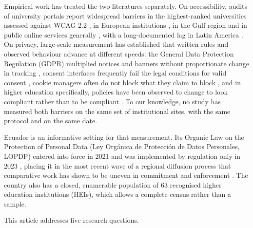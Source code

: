 \documentclass[pdflatex,sn-basic,Numbered,iicol]{sn-jnl}
\theoremstyle{thmstyleone}
\theoremstyle{thmstyletwo}
\theoremstyle{thmstylethree}
\begin{document}
Empirical work has treated the two literatures separately. On accessibility, audits of university portals report widespread barriers in the highest-ranked universities assessed against WCAG 2.2 \citep{krittika2025accessibility}, in European institutions \citep{krejtz2025higher}, in the Gulf region \citep{fakrudeen2025evaluation} and in public online services generally \citep{aljedaani2025egovernment,iniesto2025service}, with a long-documented lag in Latin America \citep{campoverdemolina2023accessibility,acostavargas2020dataset}. On privacy, large-scale measurement has established that written rules and observed behaviour advance at different speeds: the General Data Protection Regulation (GDPR) \citep{gdpr2016} multiplied notices and banners without proportionate change in tracking \citep{degeling2019value,trevisan2019four,kretschmer2021cookie}, consent interfaces frequently fail the legal conditions for valid consent \citep{matte2020cookie,nouwens2020dark,gray2021dark,habib2022okay}, cookie managers often do not block what they claim to block \citep{sanchezrola2019can,bollinger2022automating}, and in higher education specifically, policies have been observed to change to look compliant rather than to be compliant \citep{munot2025compliance}. To our knowledge, no study has measured both barriers on the same set of institutional sites, with the same protocol and on the same date.

Ecuador is an informative setting for that measurement. Its Organic Law on the Protection of Personal Data (Ley Org\'anica de Protecci\'on de Datos Personales, LOPDP) entered into force in 2021 and was implemented by regulation only in 2023 \citep{lopdp2021,reglamentolopdp2023}, placing it in the most recent wave of a regional diffusion process that comparative work has shown to be uneven in commitment and enforcement \citep{carrillo2022follow,chavarriamora2025lack}. The country also has a closed, enumerable population of 63 recognised higher education institutions (HEIs), which allows a complete census rather than a sample.

This article addresses five research questions.
\end{document}
